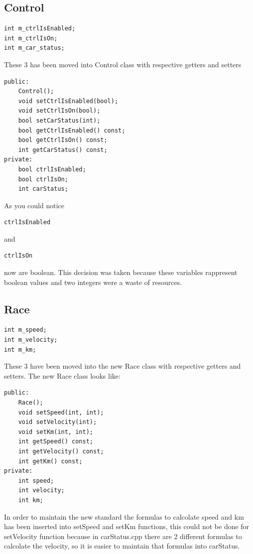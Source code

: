 \documentclass[12pt, letterpaper]{article}
\begin{document}
\begin{flushleft}
\subsection{Control}
\begin{verbatim}
int m_ctrlIsEnabled;
int m_ctrlIsOn;
int m_car_status;
\end{verbatim}
These 3 has been moved into Control class with respective getters and setters
\begin{verbatim}
public:
    Control();
    void setCtrlIsEnabled(bool);
    void setCtrlIsOn(bool);
    bool setCarStatus(int);
    bool getCtrlIsEnabled() const;
    bool getCtrlIsOn() const;
    int getCarStatus() const;
private:
    bool ctrlIsEnabled;
    bool ctrlIsOn;
    int carStatus;
\end{verbatim}
As you could notice \begin{verbatim}ctrlIsEnabled\end{verbatim} and \begin{verbatim}ctrlIsOn\end{verbatim} now are boolean. This decision was taken because these variables rappresent boolean values and two integers were a waste of resources.

\end{flushleft}

\subsection{Race}
\begin{verbatim}
int m_speed;
int m_velocity;
int m_km;
\end{verbatim}
These 3 have been moved into the new Race class with respective getters and setters.\newline
The new Race class looks like:
\begin{verbatim}
public:
    Race();
    void setSpeed(int, int);
    void setVelocity(int);
    void setKm(int, int);
    int getSpeed() const;
    int getVelocity() const;
    int getKm() const;
private:
    int speed;
    int velocity;
    int km;
\end{verbatim}
In order to maintain the new standard the formulas to calcolate speed and km has been inserted into setSpeed and setKm functions, this could not be done for setVelocity function because in carStatus.cpp there are 2 different formulas to calcolate the velocity, so it is easier to maintain that formulas into carStatus.
\end{document}
